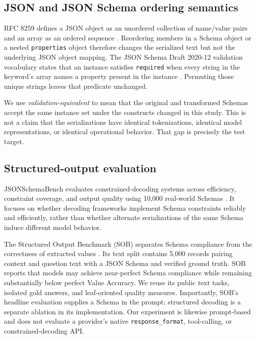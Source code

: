 \documentclass[10pt]{article}
\begin{document}
\subsection{JSON and JSON Schema ordering semantics}
RFC 8259 defines a JSON object as an unordered collection of name/value pairs and an array as an ordered sequence \citep{rfc8259}. Reordering members in a Schema object or a nested \texttt{properties} object therefore changes the serialized text but not the underlying JSON object mapping. The JSON Schema Draft 2020-12 validation vocabulary states that an instance satisfies \texttt{required} when every string in the keyword's array names a property present in the instance \citep{jsonschema2020validation}. Permuting those unique strings leaves that predicate unchanged.

We use \emph{validation-equivalent} to mean that the original and transformed Schemas accept the same instance set under the constructs changed in this study. This is not a claim that the serializations have identical tokenizations, identical model representations, or identical operational behavior. That gap is precisely the test target.

\subsection{Structured-output evaluation}
JSONSchemaBench evaluates constrained-decoding systems across efficiency, constraint coverage, and output quality using 10,000 real-world Schemas \citep{geng2025jsonschemabench}. It focuses on whether decoding frameworks implement Schema constraints reliably and efficiently, rather than whether alternate serializations of the same Schema induce different model behavior.

The Structured Output Benchmark (SOB) separates Schema compliance from the correctness of extracted values \citep{singh2026sob}. Its text split contains 5,000 records pairing context and question text with a JSON Schema and verified ground truth. SOB reports that models may achieve near-perfect Schema compliance while remaining substantially below perfect Value Accuracy. We reuse its public text tasks, isolated gold answers, and leaf-oriented quality measures. Importantly, SOB's headline evaluation supplies a Schema in the prompt; structured decoding is a separate ablation in its implementation. Our experiment is likewise prompt-based and does not evaluate a provider's native \texttt{response\_format}, tool-calling, or constrained-decoding API.
\end{document}
